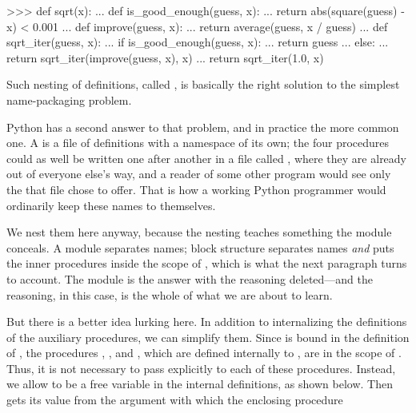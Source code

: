 \begin{codeBlock}
>>> def sqrt(x):
...     def is_good_enough(guess, x):
...         return abs(square(guess) - x) < 0.001
...     def improve(guess, x):
...         return average(guess, x / guess)
...     def sqrt_iter(guess, x):
...         if is_good_enough(guess, x):
...             return guess
...         else:
...             return sqrt_iter(improve(guess, x), x)
...     return sqrt_iter(1.0, x)
\end{codeBlock}

\noindent
Such nesting of definitions, called , is basically the
right solution to the simplest name-packaging problem.

\begin{revealTheSurface}
Python has a second answer to that problem, and in practice the more common one.
A  is a file of definitions with a namespace of its own; the
four procedures could as well be written one after another in a file called
, where they are already out of everyone else's way, and a reader
of some other program would see only the  that file chose to offer.
That is how a working Python programmer would ordinarily keep these names to
themselves.

We nest them here anyway, because the nesting teaches something the module
conceals.  A module separates names; block structure separates names \emph{and}
puts the inner procedures inside the scope of , which is what the next
paragraph turns to account.  The module is the answer with the reasoning
deleted---and the reasoning, in this case, is the whole of what we are about to
learn.
\end{revealTheSurface}  But there is a better
idea lurking here.  In addition to internalizing the definitions of the
auxiliary procedures, we can simplify them.  Since  is bound in the
definition of , the procedures ,
, and , which are defined internally to
, are in the scope of .  Thus, it is not necessary to pass
 explicitly to each of these procedures.  Instead, we allow  to
be a free variable in the internal definitions, as shown below. Then 
gets its value from the argument with which the enclosing procedure 
